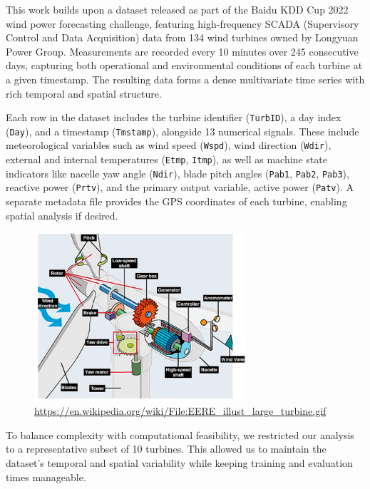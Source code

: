 This work builds upon a dataset released as part of the Baidu KDD Cup 2022 wind power forecasting challenge, featuring high-frequency SCADA (Supervisory Control and Data Acquisition) data from 134 wind turbines owned by Longyuan Power Group. Measurements are recorded every 10 minutes over 245 consecutive days, capturing both operational and environmental conditions of each turbine at a given timestamp. The resulting data forms a dense multivariate time series with rich temporal and spatial structure.

Each row in the dataset includes the turbine identifier (\texttt{TurbID}), a day index (\texttt{Day}), and a timestamp (\texttt{Tmstamp}), alongside 13 numerical signals. These include meteorological variables such as wind speed (\texttt{Wspd}), wind direction (\texttt{Wdir}), external and internal temperatures (\texttt{Etmp}, \texttt{Itmp}), as well as machine state indicators like nacelle yaw angle (\texttt{Ndir}), blade pitch angles (\texttt{Pab1}, \texttt{Pab2}, \texttt{Pab3}), reactive power (\texttt{Prtv}), and the primary output variable, active power (\texttt{Patv}). A separate metadata file provides the GPS coordinates of each turbine, enabling spatial analysis if desired.

\begin{figure}[h]
    \centering
    \includegraphics[width=0.7\textwidth]{figures/turbine.png}
    \caption{\url{https://en.wikipedia.org/wiki/File:EERE_illust_large_turbine.gif}}
    \label{fig:turbine}
\end{figure}

To balance complexity with computational feasibility, we restricted our analysis to a representative subset of 10 turbines. This allowed us to maintain the dataset’s temporal and spatial variability while keeping training and evaluation times manageable.


